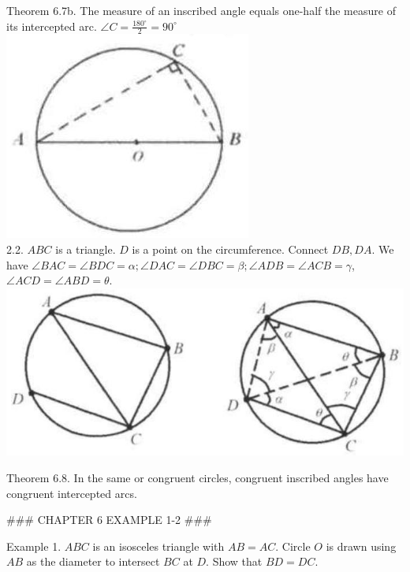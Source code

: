 \documentclass[10pt]{article}
\begin{document}
Theorem 6.7b. The measure of an inscribed angle equals one-half the measure of its intercepted arc. \(\angle C=\frac{180^{\circ}}{2}=90^{\circ}\)\\
\includegraphics[max width=\textwidth, center]{2025_04_17_97bc1f7e44d93c271a88g-162}\\
2.2. \(A B C\) is a triangle. \(D\) is a point on the circumference. Connect \(D B, D A\). We have \(\angle B A C=\angle B D C=\alpha ; \angle D A C=\angle D B C=\beta ; \angle A D B=\angle A C B=\gamma\), \(\angle A C D=\angle A B D=\theta\).\\
\includegraphics[max width=\textwidth, center]{2025_04_17_97bc1f7e44d93c271a88g-162(2)}

Theorem 6.8. In the same or congruent circles, congruent inscribed angles have congruent intercepted arcs.


### CHAPTER 6 EXAMPLE 1-2 ###

Example 1. \(A B C\) is an isosceles triangle with \(A B=A C\). Circle \(O\) is drawn using \(A B\) as the diameter to intersect \(B C\) at \(D\). Show that \(B D=D C\).
\end{document}
